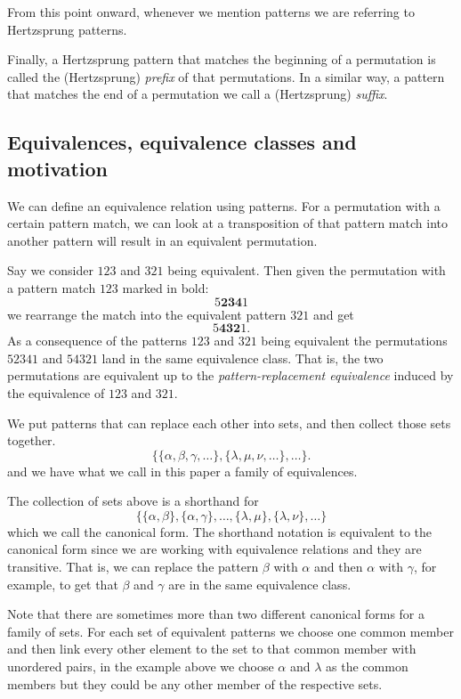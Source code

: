 \documentclass[a4paper, 11pt, english]{article}
\theoremstyle{definition}
\begin{document}
From this point onward, whenever we mention patterns we are referring to
Hertzsprung patterns.

Finally, a Hertzsprung pattern that matches the beginning of a permutation is
called the (Hertzsprung) \emph{prefix} of that permutations. In a similar way, a pattern
that matches the end of a permutation we call a (Hertzsprung) \emph{suffix}.

\subsection{Equivalences, equivalence classes and motivation}
We can define an equivalence relation using patterns. For a permutation with a certain pattern
match, we can look at a transposition of that pattern match into another pattern will result in an
equivalent permutation. 

Say we consider $123$ and $321$ being equivalent. Then given the
permutation with a pattern match $123$ marked in bold:
\[
  5\bm{234}1
\]
we rearrange the match into the equivalent pattern $321$ and get
\[
  5\bm{432}1.
\]
As a consequence of the patterns $123$ and $321$ being equivalent the permutations $52341$ and
$54321$ land in the same equivalence class. That is, the two permutations are equivalent up to the
\emph{pattern-replacement equivalence} induced by the equivalence of $123$ and $321$.

We put patterns that can replace each other into sets, and then collect those sets together. 
\[
    \{ \{\alpha, \beta, \gamma, \dots \}, \{\lambda, \mu, \nu, \dots \}, \dots
    \}.
\]
and we have what we call in this paper a family of equivalences.

The collection of sets above is a shorthand for
\[
    \{ \{ \alpha, \beta \}, \{ \alpha, \gamma \}, \dots, \{ \lambda, \mu \}, \{
        \lambda, \nu \}, \dots \}
\] 
which we call the canonical form. The shorthand notation is equivalent to the canonical form since
we are working with equivalence relations and they are transitive.
That is, we can replace the pattern $\beta$ with $\alpha$ and then $\alpha$ with $\gamma$, for
example, to get that $\beta$ and $\gamma$ are in the same equivalence class.

Note that there are sometimes more than two different canonical forms for a family of sets. For each 
set of equivalent patterns we choose one common member and then link every other element to the set to that common member
with unordered pairs, in the example above we choose $\alpha$ and $\lambda$ as the common members
but they could be any other member of the respective sets.
\end{document}
